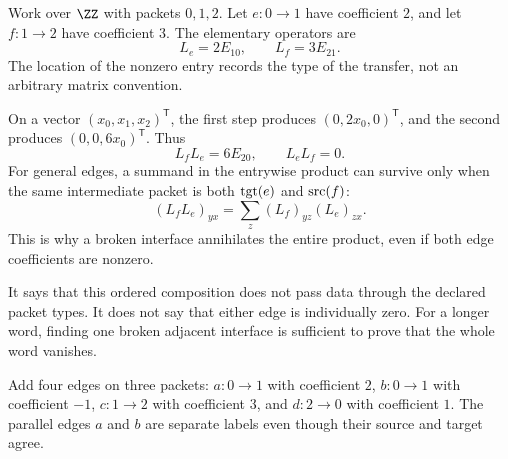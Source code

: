
Work over $\ZZ$ with packets $0,1,2$. Let $e:0\to1$ have coefficient $2$, and let $f:1\to2$ have coefficient $3$. The elementary operators are
\[
L_e=2E_{10},\qquad L_f=3E_{21}.
\]
The location of the nonzero entry records the type of the transfer, not an arbitrary matrix convention.


On a vector $(x_0,x_1,x_2)^\mathsf T$, the first step produces $(0,2x_0,0)^\mathsf T$, and the second produces $(0,0,6x_0)^\mathsf T$. Thus
\[
L_fL_e=6E_{20},\qquad L_eL_f=0.
\]
For general edges, a summand in the entrywise product can survive only when the same intermediate packet is both $\operatorname{tgt}(e)$ and $\operatorname{src}(f)$:
\[
(L_fL_e)_{yx}=\sum_z(L_f)_{yz}(L_e)_{zx}.
\]
This is why a broken interface annihilates the entire product, even if both edge coefficients are nonzero.

It says that this ordered composition does not pass data through the declared packet types. It does not say that either edge is individually zero. For a longer word, finding one broken adjacent interface is sufficient to prove that the whole word vanishes.


Add four edges on three packets: $a:0\to1$ with coefficient $2$, $b:0\to1$ with coefficient $-1$, $c:1\to2$ with coefficient $3$, and $d:2\to0$ with coefficient $1$. The parallel edges $a$ and $b$ are separate labels even though their source and target agree.


